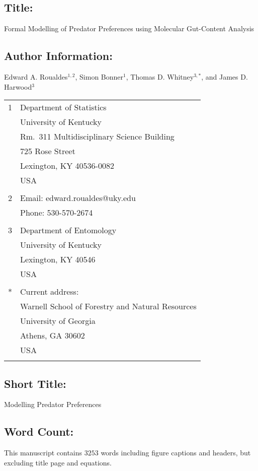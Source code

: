 \documentclass[12pt]{article}
\begin{document}
\subsection*{Title:}  Formal Modelling of Predator Preferences using Molecular Gut-Content Analysis

\subsection*{Author Information:}
Edward A. Roualdes$^{1,2}$, Simon Bonner$^1$, Thomas D. Whitney$^{3,*}$, and James D. Harwood$^3$
 
\begin{tabular}{ll}
  1 & Department of Statistics\\
  & University of Kentucky\\
  & Rm.~311 Multidisciplinary Science Building\\
  & 725 Rose Street\\
  & Lexington, KY 40536-0082\\
  & USA\\
  \\
  2 & Email: edward.roualdes@uky.edu\\
  & Phone: 530-570-2674\\
  \\
  3 & Department of Entomology\\
  & University of Kentucky \\
  & Lexington, KY 40546\\
  & USA \\
  \\
  * & Current address: \\
  & Warnell School of Forestry and Natural Resources \\
  & University of Georgia \\
  & Athens, GA 30602\\
  & USA \\
  \\

\end{tabular}

\subsection*{Short Title:}
Modelling Predator Preferences

\subsection*{Word Count:}
This manuscript contains $3253$ words including figure captions and headers, but excluding title page and equations. 
\end{document}
